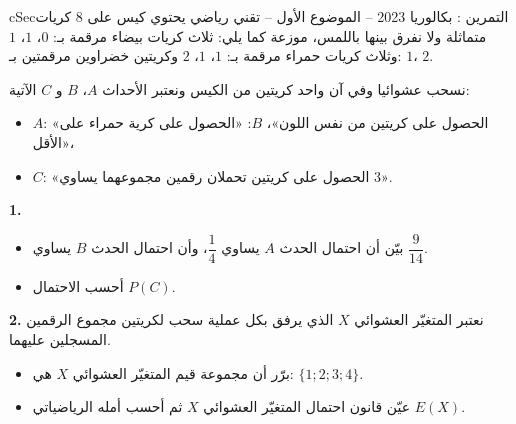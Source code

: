 \documentclass[12pt,a4paper]{article}
\newenvironment{BOX}[2]{\begin{otherlanguage}{english}\begin{arbox}{#1}{#2}}{\end{arbox}\end{otherlanguage}}
\newcounter{exo}
\newenvironment{tamrin}[1]{\stepcounter{exo}\begin{BOX}{cSec}{التمرين \theexo: #1}}{\end{BOX}}
\newenvironment{sq}{\begin{itemize}[leftmargin=2.4em,itemsep=3pt]}{\end{itemize}}
\newcommand{\qa}{\item[(أ)]}\newcommand{\qb}{\item[(ب)]}\newcommand{\qc}{\item[(جـ)]}\newcommand{\qd}{\item[(د)]}\newcommand{\qe}{\item[(هـ)]}
\newcommand{\QQ}[1]{\par\smallskip\textbf{#1.} }
\begin{document}
\begin{tamrin}{بكالوريا 2023 -- الموضوع الأول -- تقني رياضي}
يحتوي كيس على $8$ كريات متماثلة ولا نفرق بينها باللمس، موزعة كما يلي: ثلاث كريات بيضاء مرقمة بـ: $0$، $1$، $1$ وثلاث كريات حمراء مرقمة بـ: $1$، $1$، $2$ وكريتين خضراوين مرقمتين بـ: $1$، $2$.

نسحب عشوائيا وفي آن واحد كريتين من الكيس ونعتبر الأحداث $A$، $B$ و $C$ الآتية:
\begin{itemize}
\item $A$: «الحصول على كريتين من نفس اللون»، \quad $B$: «الحصول على كرية حمراء على الأقل»،
\item $C$: «الحصول على كريتين تحملان رقمين مجموعهما يساوي $3$».
\end{itemize}
\QQ{1}
\begin{sq}
\qa بيّن أن احتمال الحدث $A$ يساوي $\dfrac{1}{4}$، وأن احتمال الحدث $B$ يساوي $\dfrac{9}{14}$.
\qb أحسب الاحتمال $P(C)$.
\end{sq}
\QQ{2} نعتبر المتغيّر العشوائي $X$ الذي يرفق بكل عملية سحب لكريتين مجموع الرقمين المسجلين عليهما.
\begin{sq}
\qa برّر أن مجموعة قيم المتغيّر العشوائي $X$ هي: $\{1;2;3;4\}$.
\qb عيّن قانون احتمال المتغيّر العشوائي $X$ ثم أحسب أمله الرياضياتي $E(X)$.
\end{sq}
\end{tamrin}
\end{document}
